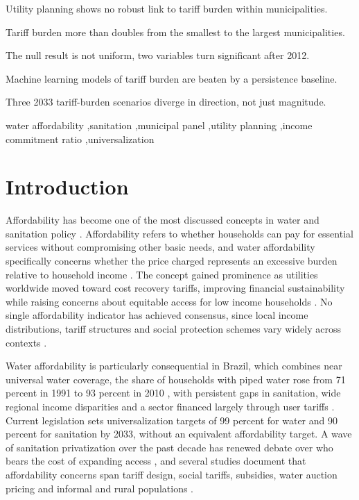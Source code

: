 \documentclass[preprint,12pt]{elsarticle}
\begin{document}
\begin{frontmatter}
\begin{highlights}
\item Utility planning shows no robust link to tariff burden within municipalities.
\item Tariff burden more than doubles from the smallest to the largest municipalities.
\item The null result is not uniform, two variables turn significant after 2012.
\item Machine learning models of tariff burden are beaten by a persistence baseline.
\item Three 2033 tariff-burden scenarios diverge in direction, not just magnitude.
\end{highlights}

\begin{keyword}
water affordability \sep sanitation \sep municipal panel \sep utility planning \sep income commitment ratio \sep universalization
\end{keyword}

\end{frontmatter}

\section{Introduction}\label{sec1}

Affordability has become one of the most discussed concepts in water and sanitation policy \citep{Fagundes2025b,Skerker2024,Patterson2023,RomeroGomez2024,Pierce2021,Teodoro2018}. Affordability refers to whether households can pay for essential services without compromising other basic needs, and water affordability specifically concerns whether the price charged represents an excessive burden relative to household income \citep{Fagundes2023,Pierce2021,Teodoro2018,Vanhille2018,Wichman2025}. The concept gained prominence as utilities worldwide moved toward cost recovery tariffs, improving financial sustainability while raising concerns about equitable access for low income households \citep{Wichman2025,Patterson2023}. No single affordability indicator has achieved consensus, since local income distributions, tariff structures and social protection schemes vary widely across contexts \citep{Skerker2024,Torio2025}.

Water affordability is particularly consequential in Brazil, which combines near universal water coverage, the share of households with piped water rose from 71 percent in 1991 to 93 percent in 2010 \citep{Fagundes2023}, with persistent gaps in sanitation, wide regional income disparities and a sector financed largely through user tariffs \citep{Andres2024,Barbosa2024}. Current legislation sets universalization targets of 99 percent for water and 90 percent for sanitation by 2033, without an equivalent affordability target. A wave of sanitation privatization over the past decade has renewed debate over who bears the cost of expanding access \citep{Fagundes2025c,Barra2026,Bermann2024}, and several studies document that affordability concerns span tariff design, social tariffs, subsidies, water auction pricing and informal and rural populations \citep{Amorim2025,Fraga2025,Moreira2025,Correa2026,Lopes2024,Fagundes2024,Mendes2026,LimaeSilva2026}.
\end{document}
